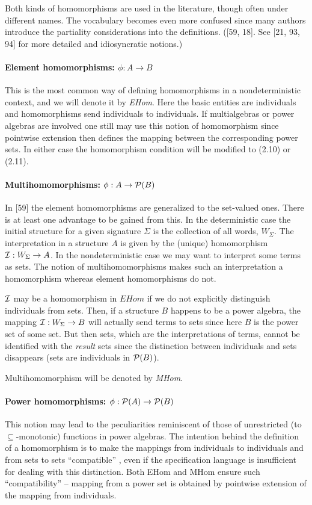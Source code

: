 \documentclass[10pt]{article}
\newcommand{\GTerms}{W_{\Sigma}}
\newcommand{\PSet}{{\cal P}}
\newcommand{\into}{\mathrel{\rightarrow}}
\newcommand{\uni}{{\cal I}}
\begin{document}
Both 
kinds of homomorphisms are used in the literature, though often under 
different names. The vocabulary becomes even more confused since many 
authors introduce the partiality considerations into the definitions. 
([59, 18]. See [21, 93, 94] for more detailed 
and idiosyncratic notions.)

\paragraph{ Element homomorphisms: $\phi: A\into B$} 
This is the most common way of 
defining homomorphisms in a nondeterministic context, and we will 
denote it by {\em EHom}.
Here the basic entities are individuals and homomorphisms send 
individuals to
 individuals. If multialgebras or power algebras are involved one 
still may use this notion of homomorphism since pointwise extension 
then defines the mapping between the corresponding power sets. In 
either case the homomorphism condition will be modified 
to (2.10) or (2.11).  

\paragraph{Multihomomorphisms: $\phi : A\into\PSet(B)$} 
In [59] the element homomorphisms 
are generalized to the set-valued ones. There is at least one 
advantage to be gained from this. In the deterministic case the 
initial structure for a given signature $\Sigma$
 is the collection of all words, $\GTerms$. The 
interpretation in a structure $A$ is given by the 
(unique) homomorphism $\uni:\GTerms\into A$.
In the nondeterministic case we may want to interpret some terms as 
sets. The notion of multihomomorphisms makes such an interpretation a 
homomorphism whereas element homomorphisms do not. 

$\uni$ may be a homomorphism in $EHom$ 
if we do not explicitly distinguish individuals from sets. Then, if a 
structure $B$ happens to be a power algebra, the mapping 
$\uni:\GTerms\into B$ will actually send terms to sets since 
here $B$ is the power set 
of some set. But then sets, which are the interpretations of terms, 
cannot be identified with the {\em result}
 sets since the distinction between individuals and sets disappears 
(sets are individuals in $\PSet(B)$).

Multihomomorphism will be denoted by {\em MHom}.

\paragraph{ Power homomorphisms: $\phi:\PSet(A)\into\PSet(B)$}
This notion may lead to the 
peculiarities reminiscent of those of unrestricted (to $\subseteq$-monotonic) 
functions in power algebras. The intention behind 
the definition of a homomorphism is to make 
the mappings from individuals to individuals and from sets to sets 
``compatible'' , even if the specification language 
is insufficient for dealing with this distinction.  Both EHom and 
MHom ensure such ``compatibility''  
 --   mapping from a power set is obtained by pointwise extension 
of the mapping from individuals.
\end{document}
